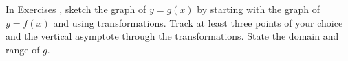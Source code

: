 {\noindent In Exercises}
{, sketch the graph of $y=g(x)$ by starting with the graph of $y = f(x)$ and using transformations.  Track at least three points of your choice and the vertical asymptote through the transformations. State the domain and range of $g$.}
